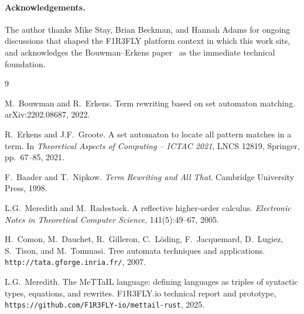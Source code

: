 \documentclass[11pt]{article}
\theoremstyle{plain}
\theoremstyle{definition}
\theoremstyle{remark}
\begin{document}
\paragraph{Acknowledgements.}
The author thanks Mike Stay, Brian Beckman, and Hannah Adams for ongoing
discussions that shaped the F1R3FLY platform context in which this work
sits, and acknowledges the Bouwman--Erkens paper~\cite{BouwmanErkens2022}
as the immediate technical foundation.

\begin{thebibliography}{9}

M.~Bouwman and R.~Erkens.
\newblock Term rewriting based on set automaton matching.
\newblock arXiv:2202.08687, 2022.

R.~Erkens and J.F.~Groote.
\newblock A set automaton to locate all pattern matches in a term.
\newblock In \emph{Theoretical Aspects of Computing -- ICTAC 2021},
  LNCS 12819, Springer, pp.~67--85, 2021.

F.~Baader and T.~Nipkow.
\newblock \emph{Term Rewriting and All That}.
\newblock Cambridge University Press, 1998.

L.G.~Meredith and M.~Radestock.
\newblock A reflective higher-order calculus.
\newblock \emph{Electronic Notes in Theoretical Computer Science},
  141(5):49--67, 2005.

H.~Comon, M.~Dauchet, R.~Gilleron, C.~L\"oding, F.~Jacquemard,
  D.~Lugiez, S.~Tison, and M.~Tommasi.
\newblock Tree automata techniques and applications.
\newblock \texttt{http://tata.gforge.inria.fr/}, 2007.

L.G.~Meredith.
\newblock The MeTTaIL language: defining languages as triples of syntactic
  types, equations, and rewrites.
\newblock F1R3FLY.io technical report and prototype,
  \texttt{https://github.com/F1R3FLY-io/mettail-rust}, 2025.

\end{thebibliography}
\end{document}
